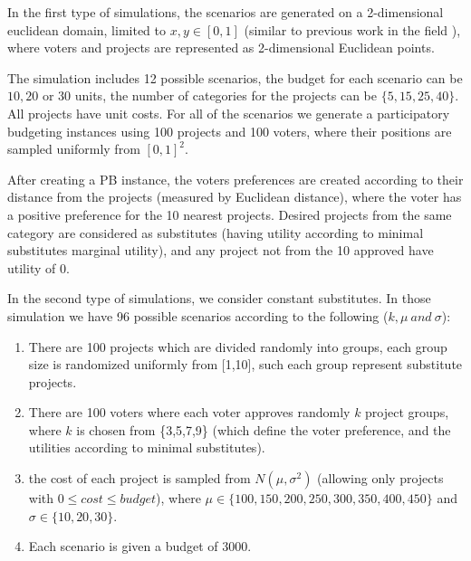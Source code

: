 \documentclass[runningheads]{llncs}
\begin{document}
In the first type of simulations, the scenarios are generated on a 2-dimensional euclidean domain, limited to $x,y\in [0,1]$ (similar to previous work in the field \cite{talmon2019framework, skowron2020participatory}), where voters and projects are represented as 2-dimensional Euclidean points.
 
 The simulation includes  12 possible scenarios, the budget  for each scenario can be $10, 20$ or $30$ units, the number of  categories for the projects can be  $\{5,15,25,40\}$. 
  All projects have unit costs. For all of the scenarios we generate a participatory budgeting instances using 100 projects and 100 voters, where their positions  are sampled uniformly from $[0,1]^2$.



After creating a PB instance, the voters preferences are created according to their distance from the projects (measured by Euclidean distance), where the voter has a positive preference for the 10 nearest projects. Desired projects from the same category are considered  as substitutes (having utility according to minimal substitutes marginal utility), and any project not from the 10 approved have utility of 0.


In the second type of simulations, we consider constant substitutes. In those simulation we have 96 possible scenarios according to the following ($k, \mu \ and\  \sigma$):


\begin{enumerate}
    \item There are 100 projects which are divided randomly into groups, each group size is randomized uniformly from [1,10], such each group represent substitute projects.
    
    \item There are 100 voters where each voter approves randomly $k$ project groups, where $k$ is chosen from \{3,5,7,9\} (which define the voter preference, and the utilities according to minimal substitutes). 
    
    \item the cost of each project is sampled from  $N(\mu,\sigma^2)$ (allowing only projects with $0\leq cost\leq budget$), where $\mu\in\{100,150,200,250,300,350,400,450\}$ and $\sigma\in\{10,20,30\}$.
    
    \item Each scenario is given a budget of 3000.
\end{enumerate}
\end{document}
